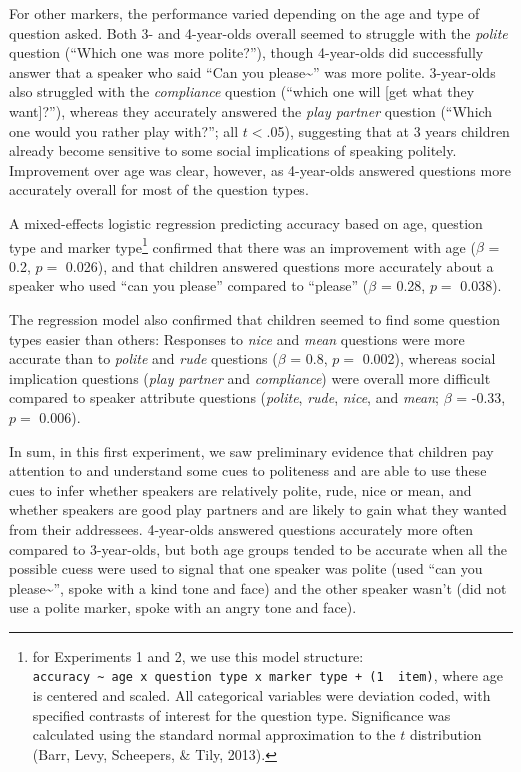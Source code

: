 \documentclass[10pt, letterpaper]{article}
\begin{document}
For other markers, the performance varied depending on the age and type
of question asked. Both 3- and 4-year-olds overall seemed to struggle
with the \emph{polite} question (``Which one was more polite?''), though
4-year-olds did successfully answer that a speaker who said ``Can you
please\textasciitilde{}'' was more polite. 3-year-olds also struggled
with the \emph{compliance} question (``which one will {[}get what they
want{]}?''), whereas they accurately answered the \emph{play partner}
question (``Which one would you rather play with?''; all \(t<\).05),
suggesting that at 3 years children already become sensitive to some
social implications of speaking politely. Improvement over age was
clear, however, as 4-year-olds answered questions more accurately
overall for most of the question types.

A mixed-effects logistic regression predicting accuracy based on age,
question type and marker type\footnote{for Experiments 1 and 2, we use
  this model structure:
  \texttt{accuracy\ \textasciitilde{}\ age\ x\ question\ type\ x\ marker\ type\ +\ (1\ \textbar{}\ item)},
  where age is centered and scaled. All categorical variables were
  deviation coded, with specified contrasts of interest for the question
  type. Significance was calculated using the standard normal
  approximation to the \(t\) distribution (Barr, Levy, Scheepers, \&
  Tily, 2013).} confirmed that there was an improvement with age
(\(\beta\) = 0.2, \(p =\) 0.026), and that children answered questions
more accurately about a speaker who used ``can you please'' compared to
``please'' (\(\beta\) = 0.28, \(p =\) 0.038).

The regression model also confirmed that children seemed to find some
question types easier than others: Responses to \emph{nice} and
\emph{mean} questions were more accurate than to \emph{polite} and
\emph{rude} questions (\(\beta\) = 0.8, \(p =\) 0.002), whereas social
implication questions (\emph{play partner} and \emph{compliance}) were
overall more difficult compared to speaker attribute questions
(\emph{polite}, \emph{rude}, \emph{nice}, and \emph{mean}; \(\beta\) =
-0.33, \(p =\) 0.006).

In sum, in this first experiment, we saw preliminary evidence that
children pay attention to and understand some cues to politeness and are
able to use these cues to infer whether speakers are relatively polite,
rude, nice or mean, and whether speakers are good play partners and are
likely to gain what they wanted from their addressees. 4-year-olds
answered questions accurately more often compared to 3-year-olds, but
both age groups tended to be accurate when all the possible cuess were
used to signal that one speaker was polite (used ``can you
please\textasciitilde{}'', spoke with a kind tone and face) and the
other speaker wasn't (did not use a polite marker, spoke with an angry
tone and face).
\end{document}
